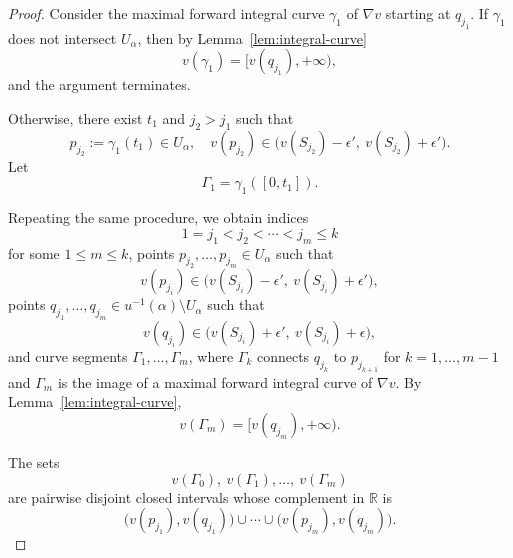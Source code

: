 \documentclass[11pt]{amsart}
\theoremstyle{plain}
\theoremstyle{definition}
\theoremstyle{remark}
\numberwithin{equation}{section}
\begin{document}
\begin{proof}
    Consider the maximal forward integral curve $\gamma_1$ of $\nabla v$ starting at $q_{j_1}$.
    If $\gamma_1$ does not intersect $U_{\alpha}$, then by Lemma~\ref{lem:integral-curve}
    \begin{equation}
        v(\gamma_1) = [v(q_{j_1}), +\infty),
    \end{equation}
    and the argument terminates.

    Otherwise, there exist $t_1$ and $j_2 > j_1$ such that
    \begin{equation}
        p_{j_2} := \gamma_1(t_1) \in U_{\alpha}, \quad v(p_{j_2}) \in \bigl(v(S_{j_2}) - \epsilon', \ v(S_{j_2}) + \epsilon'\bigr).
    \end{equation}
    Let
    \begin{equation}
        \Gamma_1 = \gamma_1([0, t_1]).
    \end{equation}

    Repeating the same procedure, we obtain indices
    \begin{equation}
        1 = j_1 < j_2 < \cdots < j_m \le k
    \end{equation}
    for some $1 \le m \le k$, points $p_{j_2}, \ldots, p_{j_m} \in U_{\alpha}$ such that
    \begin{equation}
        v(p_{j_i}) \in \bigl(v(S_{j_i}) - \epsilon', \ v(S_{j_i}) + \epsilon'\bigr),
    \end{equation}
    points $q_{j_1}, \ldots, q_{j_m} \in u^{-1}(\alpha) \setminus U_{\alpha}$ such that
    \begin{equation}
        v(q_{j_i}) \in \bigl(v(S_{j_i}) + \epsilon', \ v(S_{j_i}) + \epsilon\bigr),
    \end{equation}
    and curve segments $\Gamma_1, \ldots, \Gamma_m$, where $\Gamma_k$ connects $q_{j_k}$ to $p_{j_{k+1}}$ for $k = 1, \ldots, m-1$ and $\Gamma_m$ is the image of a maximal forward integral curve of $\nabla v$.
    By Lemma~\ref{lem:integral-curve},
    \begin{equation}
        v(\Gamma_m) = [v(q_{j_m}), +\infty).
    \end{equation}

    The sets
    \begin{equation}
        v(\Gamma_0), \ v(\Gamma_1), \ldots, \ v(\Gamma_m)
    \end{equation}
    are pairwise disjoint closed intervals whose complement in $\mathbb{R}$ is
    \begin{equation}
        \bigl(v(p_{j_1}), v(q_{j_1})\bigr) \cup \cdots \cup \bigl(v(p_{j_m}), v(q_{j_m})\bigr).
    \end{equation}


\end{proof}
\end{document}
